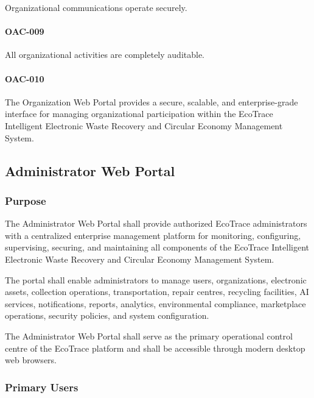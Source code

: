 Organizational communications operate securely.

\paragraph{OAC-009}

All organizational activities are completely auditable.

\paragraph{OAC-010}

The Organization Web Portal provides a secure, scalable, and
enterprise-grade interface for managing organizational participation
within the EcoTrace Intelligent Electronic Waste Recovery and Circular
Economy Management System.

\subsection{Administrator Web Portal}

\subsubsection*{Purpose}

The Administrator Web Portal shall provide authorized EcoTrace
administrators with a centralized enterprise management platform for
monitoring, configuring, supervising, securing, and maintaining all
components of the EcoTrace Intelligent Electronic Waste Recovery and
Circular Economy Management System.

The portal shall enable administrators to manage users,
organizations, electronic assets, collection operations,
transportation, repair centres, recycling facilities, AI services,
notifications, reports, analytics, environmental compliance,
marketplace operations, security policies, and system configuration.

The Administrator Web Portal shall serve as the primary operational
control centre of the EcoTrace platform and shall be accessible through
modern desktop web browsers.


\subsubsection*{Primary Users}


